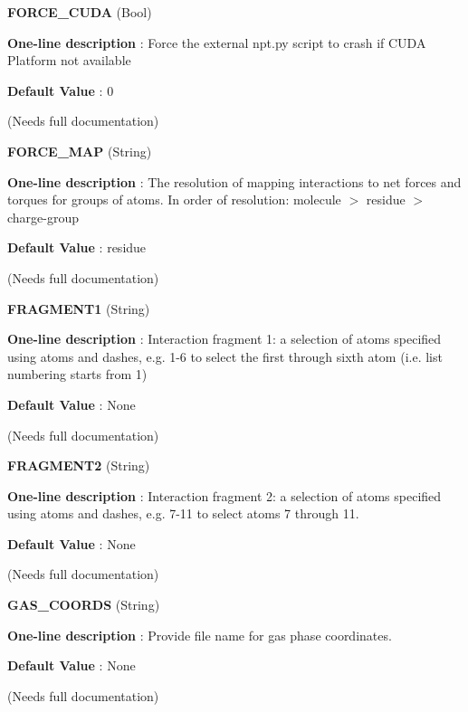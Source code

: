 \begin{DoxyItemize}
\item {\bfseries  F\-O\-R\-C\-E\-\_\-\-C\-U\-D\-A } (Bool) \par
{\bfseries  One-\/line description }\-: Force the external npt.\-py script to crash if C\-U\-D\-A Platform not available \par
{\bfseries  Default Value }\-: 0 \par
(Needs full documentation)\end{DoxyItemize}
\begin{DoxyItemize}
\item {\bfseries  F\-O\-R\-C\-E\-\_\-\-M\-A\-P } (String) \par
{\bfseries  One-\/line description }\-: The resolution of mapping interactions to net forces and torques for groups of atoms. In order of resolution\-: molecule $>$ residue $>$ charge-\/group \par
{\bfseries  Default Value }\-: residue \par
(Needs full documentation)\end{DoxyItemize}
\begin{DoxyItemize}
\item {\bfseries  F\-R\-A\-G\-M\-E\-N\-T1 } (String) \par
{\bfseries  One-\/line description }\-: Interaction fragment 1\-: a selection of atoms specified using atoms and dashes, e.\-g. 1-\/6 to select the first through sixth atom (i.\-e. list numbering starts from 1) \par
{\bfseries  Default Value }\-: None \par
(Needs full documentation)\end{DoxyItemize}
\begin{DoxyItemize}
\item {\bfseries  F\-R\-A\-G\-M\-E\-N\-T2 } (String) \par
{\bfseries  One-\/line description }\-: Interaction fragment 2\-: a selection of atoms specified using atoms and dashes, e.\-g. 7-\/11 to select atoms 7 through 11. \par
{\bfseries  Default Value }\-: None \par
(Needs full documentation)\end{DoxyItemize}
\begin{DoxyItemize}
\item {\bfseries  G\-A\-S\-\_\-\-C\-O\-O\-R\-D\-S } (String) \par
{\bfseries  One-\/line description }\-: Provide file name for gas phase coordinates. \par
{\bfseries  Default Value }\-: None \par
(Needs full documentation)\end{DoxyItemize}
